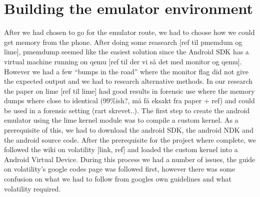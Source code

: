 \section{Building the emulator environment}
After we had chosen to go for the emulator route, we had to choose how we could get memory from the phone. After doing some reasearch [ref til pmemdum og lime], pmemdump seemed like the easiest solution since the Android SDK has a virtual machine running on qemu [ref til der vi så det med monitor og qemu]. However we had a few “bumps in the road” where the monitor flag did not give the expected output and we had to research alternative methods. In our research the paper on lime [ref til lime] had good results in forensic use where the memory dumps where close to identical (99\%ish?, må få eksakt fra paper + ref) and could be used in a forensic setting (rart skrevet..). 
The first step to create the android emulator using the lime kernel module was to compile a custom kernel. As a prerequisite of this, we had to download the android SDK, the android NDK and the android source code. After the prerequisite for the project where complete, we followed the wiki on volatility [link, ref] and loaded the custom kernel into a Android Virtual Device. During this process we had a number of issues, the guide on volatility’s google codes page was followed first, however there was some confusion on what we had to follow from googles own guidelines and what volatility required.



